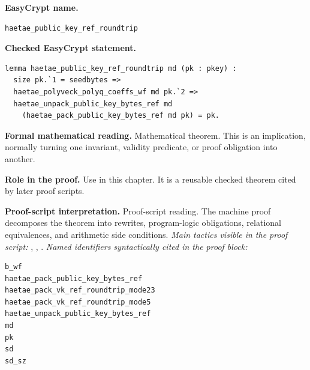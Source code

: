 \begin{formaltheorem}
\noindent\textbf{EasyCrypt name.}
\begin{lstlisting}[language=EasyCrypt,basicstyle=\ttfamily\scriptsize]
haetae_public_key_ref_roundtrip
\end{lstlisting}
\noindent\textbf{Checked EasyCrypt statement.}
\begin{lstlisting}[language=EasyCrypt,basicstyle=\ttfamily\scriptsize]
lemma haetae_public_key_ref_roundtrip md (pk : pkey) :
  size pk.`1 = seedbytes =>
  haetae_polyveck_polyq_coeffs_wf md pk.`2 =>
  haetae_unpack_public_key_bytes_ref md
    (haetae_pack_public_key_bytes_ref md pk) = pk.
\end{lstlisting}
\noindent\textbf{Formal mathematical reading.}
Mathematical theorem. This is an implication, normally turning one invariant, validity predicate, or proof obligation into another.

\noindent\textbf{Role in the proof.}
Use in this chapter. It is a reusable checked theorem cited by later proof scripts.

\noindent\textbf{Proof-script interpretation.}
Proof-script reading. The machine proof decomposes the theorem into rewrites, program-logic obligations, relational equivalences, and arithmetic side conditions.
\emph{Main tactics visible in the proof script:} , , .
\emph{Named identifiers syntactically cited in the proof block:}
\begin{lstlisting}[language=EasyCrypt,basicstyle=\ttfamily\scriptsize]
b_wf
haetae_pack_public_key_bytes_ref
haetae_pack_vk_ref_roundtrip_mode23
haetae_pack_vk_ref_roundtrip_mode5
haetae_unpack_public_key_bytes_ref
md
pk
sd
sd_sz
\end{lstlisting}

\end{formaltheorem}

